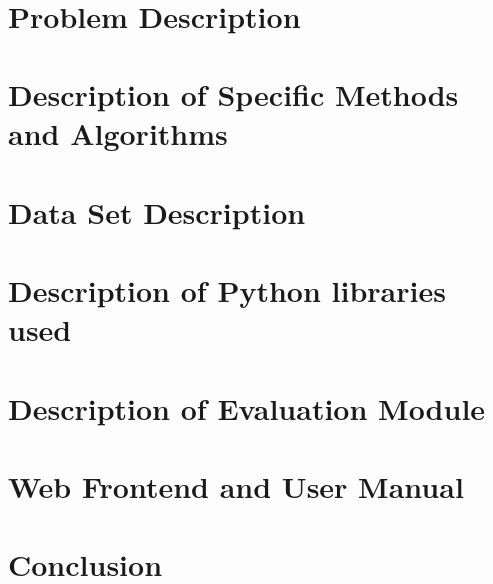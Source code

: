 \documentclass[12pt]%
{article}
\begin{document}
\begin{titlepage}

\end{titlepage}

\newpage\thispagestyle{empty}~ %
\newpage 

\begin{abstract}

\end{abstract}

\newpage

\tableofcontents

\newpage

\section{Problem Description}


\section{Description of Specific Methods and Algorithms}


\section{Data Set Description}


\section{Description of Python libraries used}


\section{Description of Evaluation Module}


\section{Web Frontend and User Manual}


\section{Conclusion}


\newpage

\printglossary[style=altlist,title=Glossary]
 
\printglossary[type=\acronymtype,style=long]
 
\printglossary[type=symbolslist,style=long]

\newpage



\end{document}
